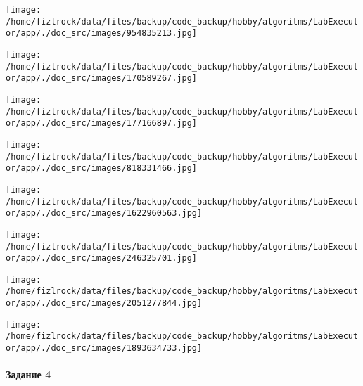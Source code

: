 \documentclass[a4paper, 12pt]{article}
\begin{document}
\texttt{[image: /home/fizlrock/data/files/backup/code\_backup/hobby/algoritms/LabExecutor/app/./doc\_src/images/954835213.jpg]}

\texttt{[image: /home/fizlrock/data/files/backup/code\_backup/hobby/algoritms/LabExecutor/app/./doc\_src/images/170589267.jpg]}

\texttt{[image: /home/fizlrock/data/files/backup/code\_backup/hobby/algoritms/LabExecutor/app/./doc\_src/images/177166897.jpg]}

\texttt{[image: /home/fizlrock/data/files/backup/code\_backup/hobby/algoritms/LabExecutor/app/./doc\_src/images/818331466.jpg]}

\texttt{[image: /home/fizlrock/data/files/backup/code\_backup/hobby/algoritms/LabExecutor/app/./doc\_src/images/1622960563.jpg]}

\texttt{[image: /home/fizlrock/data/files/backup/code\_backup/hobby/algoritms/LabExecutor/app/./doc\_src/images/246325701.jpg]}

\texttt{[image: /home/fizlrock/data/files/backup/code\_backup/hobby/algoritms/LabExecutor/app/./doc\_src/images/2051277844.jpg]}

\texttt{[image: /home/fizlrock/data/files/backup/code\_backup/hobby/algoritms/LabExecutor/app/./doc\_src/images/1893634733.jpg]}
\pagebreak
\paragraph{Задание 4}
\end{document}
